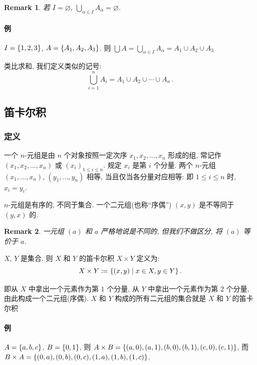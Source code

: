 \documentclass[UTF8]{ctexart}
\theoremstyle{mystyle}
\theoremstyle{myremark}
\newtheorem*{remark}{Remark}
\theoremstyle{plain}
\DeclarePairedDelimiter\set{\{}{\}}
\begin{document}
\begin{remark}
    若 $ I = \varnothing $, $ \displaystyle \bigcup_{\alpha \in I} A_\alpha = \varnothing $.
\end{remark}

\paragraph{例}
$ I = \set{1, 2, 3} $, $ A = \set{A_1, A_2, A_3} $. 则 $ \bigcup A = \bigcup_{\alpha \in I} A_\alpha = A_1 \cup A_2 \cup A_3 $

类比求和, 我们定义类似的记号: \[ \bigcup_{i = 1}^n A_i = A_1 \cup A_2 \cup \cdots \cup A_n \,.\]

\subsection{笛卡尔积}
\subsubsection{定义}
\begin{definition}[\text{$ n $-元组}]
    一个 $ n $-元组是由 $ n $ 个对象按照一定次序 $ x_1, x_2, \dots, x_n $ 形成的组, 常记作 $ (x_1, x_2, \dots, x_n) $ 或 $ (x_i)_{1 \leqslant i \leqslant n} $. 规定 $ x_i $ 是第 $ i $ 个分量. 两个 $ n $-元组 $ (x_1, \dots, x_n) $, $ (y_1, \dots, y_n) $ 相等, 当且仅当各分量对应相等: 即 $ 1 \leqslant i \leqslant n $ 时, $ x_i = y_i $.
\end{definition}

$ n $-元组是有序的, 不同于集合. 一个二元组(也称``序偶'') $ (x, y) $ 是不等同于 $ (y, x) $ 的.

\begin{remark}
    一元组 $ (a) $ 和 $ a $ 严格地说是不同的, 但我们不做区分, 将 $ (a) $ 等价于 $ a $.
\end{remark}

\begin{definition}
    $ X $, $ Y $ 是集合. 则 $ X $ 和 $ Y $ 的笛卡尔积 $ X \times Y $ 定义为: \[ X \times Y \coloneqq \set{(x, y) \mid x \in X, y \in Y} \,.\]
\end{definition}

即从 $ X $ 中拿出一个元素作为第 $ 1 $ 个分量, 从 $ Y $ 中拿出一个元素作为第 $ 2 $ 个分量, 由此构成一个二元组(序偶). $ X $ 和 $ Y $ 构成的所有二元组的集合就是 $ X $ 和 $ Y $ 的笛卡尔积

\paragraph{例}
$ A = \set{a, b, c} $, $ B = \set{0, 1} $, 则 $ A \times B = \set{(a, 0), (a, 1), (b, 0), (b, 1), (c, 0), (c, 1)} $, 而 $ B \times A = \set{(0, a), (0, b), (0, c), (1, a), (1, b), (1, c)} $.
\end{document}
